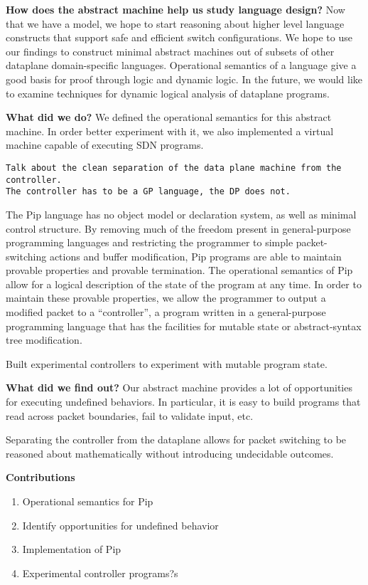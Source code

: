 \textbf{How does the abstract machine help us study language design?}
Now that we have a model, we hope to start reasoning about higher level language constructs that support safe and efficient switch configurations. We hope to use our findings to construct minimal abstract machines out of subsets of other dataplane domain-specific languages. Operational semantics of a language give a good basis for proof through logic and dynamic logic. In the future, we would like to examine techniques for dynamic logical analysis of dataplane programs.

\textbf{What did we do?}
We defined the operational semantics for this abstract machine. In order better experiment with it, we also implemented a virtual machine capable of executing SDN programs.

\begin{verbatim}
Talk about the clean separation of the data plane machine from the controller.
The controller has to be a GP language, the DP does not.
\end{verbatim}
The Pip language has no object model or declaration system, as well as minimal control structure. By removing much of the freedom present in general-purpose programming languages and restricting the programmer to simple packet-switching actions and buffer modification, Pip programs are able to maintain provable properties and provable termination. The operational semantics of Pip allow for a logical description of the state of the program at any time. In order to maintain these provable properties, we allow the programmer to output a modified packet to a ``controller'', a program written in a general-purpose programming language that has the facilities for mutable state or abstract-syntax tree modification.

Built experimental controllers to experiment with mutable program state.

\textbf{What did we find out?}
Our abstract machine provides a lot of opportunities for executing undefined behaviors. In particular, it is easy to build programs that read across packet boundaries, fail to validate input, etc. 

Separating the controller from the dataplane allows for packet switching to be reasoned about mathematically without introducing undecidable outcomes.

\textbf{Contributions}
\begin{enumerate}
\item Operational semantics for Pip
\item Identify opportunities for undefined behavior
\item Implementation of Pip
\item Experimental controller programs?s
\end{enumerate}

